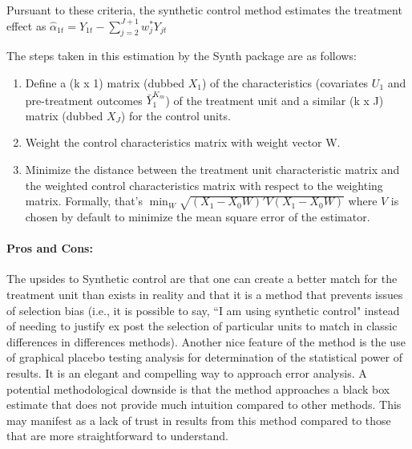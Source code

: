 \documentclass[letterpaper, 12pt]{article}
\begin{document}
Pursuant to these criteria, the synthetic control method estimates the treatment effect as $\hat{\alpha}_{1t} = Y_{1t} - \sum_{j=2}^{J+1} w_j^* Y_{jt}$

The steps taken in this estimation by the Synth package are as follows:
\begin{enumerate}
\item Define a (k x 1) matrix (dubbed $X_1$) of the characteristics (covariates $U_1$ and pre-treatment outcomes $\bar{Y}_1^{K_m}$) of the treatment unit and a similar (k x J) matrix (dubbed $X_J$) for the control units.
\item Weight the control characteristics matrix with weight vector W.
\item Minimize the distance between the treatment unit characteristic matrix and the weighted control characteristics matrix with respect to the weighting matrix. Formally, that's $\min_{W} \sqrt{(X_1 - X_0W)'V(X_1-X_0W)}$ where $V$ is chosen by default to minimize the mean square error of the estimator.
\end{enumerate}

\paragraph{Pros and Cons:} The upsides to Synthetic control are that one can create a better match for the treatment unit than exists in reality and that it is a method that prevents issues of selection bias (i.e., it is possible to say, ``I am using synthetic control" instead of needing to justify ex post the selection of particular units to match in classic differences in differences methods).  Another nice feature of the method is the use of graphical placebo testing analysis for determination of the statistical power of results.  It is an elegant and compelling way to approach error analysis.  A potential methodological downside is that the method approaches a black box estimate that does not provide much intuition compared to other methods.  This may manifest as a lack of trust in results from this method compared to those that are more straightforward to understand.   
\end{document}
